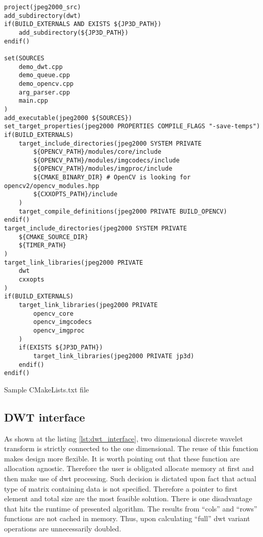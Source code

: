 \begin{listing}[!htb]
\begin{verbatim}
project(jpeg2000_src)
add_subdirectory(dwt)
if(BUILD_EXTERNALS AND EXISTS ${JP3D_PATH})
    add_subdirectory(${JP3D_PATH})
endif()

set(SOURCES
    demo_dwt.cpp
    demo_queue.cpp
    demo_opencv.cpp
    arg_parser.cpp
    main.cpp
)
add_executable(jpeg2000 ${SOURCES})
set_target_properties(jpeg2000 PROPERTIES COMPILE_FLAGS "-save-temps")
if(BUILD_EXTERNALS)
    target_include_directories(jpeg2000 SYSTEM PRIVATE
        ${OPENCV_PATH}/modules/core/include
        ${OPENCV_PATH}/modules/imgcodecs/include
        ${OPENCV_PATH}/modules/imgproc/include
        ${CMAKE_BINARY_DIR} # OpenCV is looking for opencv2/opencv_modules.hpp
        ${CXXOPTS_PATH}/include
    )
    target_compile_definitions(jpeg2000 PRIVATE BUILD_OPENCV)
endif()
target_include_directories(jpeg2000 SYSTEM PRIVATE
    ${CMAKE_SOURCE_DIR}
    ${TIMER_PATH}
)
target_link_libraries(jpeg2000 PRIVATE
    dwt
    cxxopts
)
if(BUILD_EXTERNALS)
    target_link_libraries(jpeg2000 PRIVATE
        opencv_core
        opencv_imgcodecs
        opencv_imgproc
    )
    if(EXISTS ${JP3D_PATH})
        target_link_libraries(jpeg2000 PRIVATE jp3d)
    endif()
endif()
\end{verbatim}
\caption{Sample CMakeLists.txt file}
\label{lst:sample_cmake_file}
\end{listing}

\subsection{DWT interface}

As shown at the listing \ref{lst:dwt_interface}, two dimensional discrete wavelet transform
is strictly connected to the one dimensional. The reuse of this function makes design more
flexible. It is worth pointing out that these function are allocation agnostic. Therefore
the user is obligated allocate memory at first and then make use of dwt processing. Such
decision is dictated upon fact that actual type of matrix containing data is not specified.
Therefore a pointer to first element and total size are the most feasible solution.
There is one disadvantage that hits the runtime of presented algorithm. The results
from ``cols'' and ``rows'' functions are not cached in memory. Thus, upon calculating
``full'' dwt variant operations are unnecessarily doubled.


